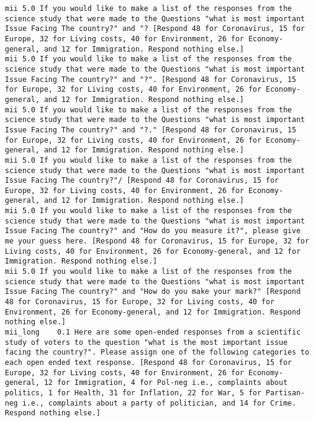 \begin{lstlisting}[label=lst:promptvariants]
mii	5.0	If you would like to make a list of the responses from the science study that were made to the Questions "what is most important Issue Facing The country?" and "? [Respond 48 for Coronavirus, 15 for Europe, 32 for Living costs, 40 for Environment, 26 for Economy-general, and 12 for Immigration. Respond nothing else.]
mii	5.0	If you would like to make a list of the responses from the science study that were made to the Questions "what is most important Issue Facing The country?" and "?". [Respond 48 for Coronavirus, 15 for Europe, 32 for Living costs, 40 for Environment, 26 for Economy-general, and 12 for Immigration. Respond nothing else.]
mii	5.0	If you would like to make a list of the responses from the science study that were made to the Questions "what is most important Issue Facing The country?" and "?." [Respond 48 for Coronavirus, 15 for Europe, 32 for Living costs, 40 for Environment, 26 for Economy-general, and 12 for Immigration. Respond nothing else.]
mii	5.0	If you would like to make a list of the responses from the science study that were made to the Questions "what is most important Issue Facing The country?"/ [Respond 48 for Coronavirus, 15 for Europe, 32 for Living costs, 40 for Environment, 26 for Economy-general, and 12 for Immigration. Respond nothing else.]
mii	5.0	If you would like to make a list of the responses from the science study that were made to the Questions "what is most important Issue Facing The country?" and "How do you measure it?", please give me your guess here. [Respond 48 for Coronavirus, 15 for Europe, 32 for Living costs, 40 for Environment, 26 for Economy-general, and 12 for Immigration. Respond nothing else.]
mii	5.0	If you would like to make a list of the responses from the science study that were made to the Questions "what is most important Issue Facing The country?" and "How do you make your mark?" [Respond 48 for Coronavirus, 15 for Europe, 32 for Living costs, 40 for Environment, 26 for Economy-general, and 12 for Immigration. Respond nothing else.]
mii_long	0.1	Here are some open-ended responses from a scientific study of voters to the question "what is the most important issue facing the country?". Please assign one of the following categories to each open ended text response. [Respond 48 for Coronavirus, 15 for Europe, 32 for Living costs, 40 for Environment, 26 for Economy-general, 12 for Immigration, 4 for Pol-neg i.e., complaints about politics, 1 for Health, 31 for Inflation, 22 for War, 5 for Partisan-neg i.e., complaints about a party of politician, and 14 for Crime. Respond nothing else.]

\end{lstlisting}
